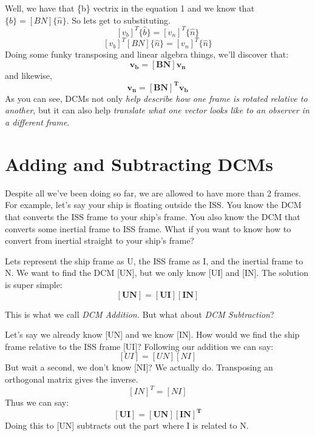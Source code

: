 \documentclass[a4paper,14pt]{extreport}
\begin{document}
Well, we have that \{b\} vectrix in the equation 1 and we know that $\{\hat{b}\} = [BN]\{\hat{n}\}$. So lets get to substituting.
\[[v_b]^T\{\hat{b}\} = [v_n]^T\{\hat{n}\}\]
\[[v_b]^T[BN]\{\hat{n}\} = [v_n]^T\{\hat{n}\}\]
Doing some funky transposing and linear algebra things, we'll discover that:
\[\bm{v_b = [BN]v_n}\]
and likewise,
\[\bm{v_n = [BN]^Tv_b}\]
As you can see, DCMs not only \emph{help describe how one frame is rotated relative to another}, but it can also help \emph{translate what one vector looks like to an observer in a different frame}.
\section{Adding and Subtracting DCMs}
Despite all we've been doing so far, we are allowed to have more than 2 frames. For example, let's say your ship is floating outside the ISS. You know the DCM that converts the ISS frame to your ship's frame. You also know the DCM that converts some inertial frame to ISS frame. What if you want to know how to convert from inertial straight to your ship's frame? 

Lets represent the ship frame as U, the ISS frame as I, and the inertial frame to N. We want to find the DCM [UN], but we only know [UI] and [IN]. The solution is super simple:
\[\bm{[UN] = [UI][IN]}\]

This is what we call \emph{DCM Addition.} But what about \emph{DCM Subtraction}?

Let's say we already know [UN] and we know [IN]. How would we find the ship frame relative to the ISS frame [UI]? Following our addition we can say:
\[[UI] = [UN][NI]\]
But wait a second, we don't know [NI]? We actually do. Transposing an orthogonal matrix gives the inverse.
\[[IN]^T = [NI]\]
Thus we can say:
\[\bm{[UI] = [UN][IN]^T}\]
Doing this to [UN] subtracts out the part where I is related to N.
\end{document}
